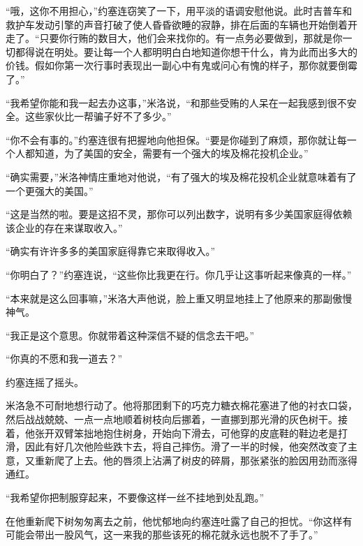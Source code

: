     “哦，这你不用担心，”约塞连窃笑了一下，用平淡的语调安慰他说。此时吉普车和救护车发动引擎的声音打破了使人昏昏欲睡的寂静，排在后面的车辆也开始倒着开走了。“只要你行贿的数目大，他们会来找你的。有一点务必要做到，那就是你一切都得说在明处。要让每一个人都明明白白地知道你想干什么，肯为此而出多大的价钱。假如你第一次行事时表现出一副心中有鬼或问心有愧的样子，那你就要倒霉了。”

    “我希望你能和我一起去办这事，”米洛说，“和那些受贿的人呆在一起我感到很不安全。这些家伙比一帮骗子好不了多少。”

    “你不会有事的。”约塞连很有把握地向他担保。“要是你碰到了麻烦，那你就让每一个人都知道，为了美国的安全，需要有一个强大的埃及棉花投机企业。”

    “确实需要，”米洛神情庄重地对他说，“有了强大的埃及棉花投机企业就意味着有了一个更强大的美国。”

    “这是当然的啦。要是这招不灵，那你可以列出数字，说明有多少美国家庭得依赖该企业的存在来谋取收入。”

    “确实有许许多多的美国家庭得靠它来取得收入。”

    “你明白了？”约塞连说，“这些你比我更在行。你几乎让这事听起来像真的一样。”

    “本来就是这么回事嘛，”米洛大声他说，脸上重又明显地挂上了他原来的那副傲慢神气。

    “我正是这个意思。你就带着这种深信不疑的信念去干吧。”

    “你真的不愿和我一道去？”

    约塞连摇了摇头。

    米洛急不可耐地想行动了。他将那团剩下的巧克力糖衣棉花塞进了他的衬衣口袋，然后战战兢兢、一点一点地顺着树枝向后挪着，一直挪到那光滑的灰色树干。接着，他张开双臂笨拙地抱住树身，开始向下滑去，可他穿的皮底鞋的鞋边老是打滑，因此有好几次他险些跌卞去，将自己摔伤。滑了一半的时候，他突然改变了主意，又重新爬了上去。他的唇须上沾满了树皮的碎屑，那张紧张的脸因用劲而涨得通红。

    “我希望你把制服穿起来，不要像这样一丝不挂地到处乱跑。”

    在他重新爬下树匆匆离去之前，他忧郁地向约塞连吐露了自己的担忧。“你这样有可能会带出一股风气，这一来我的那些该死的棉花就永远也脱不了手了。”
